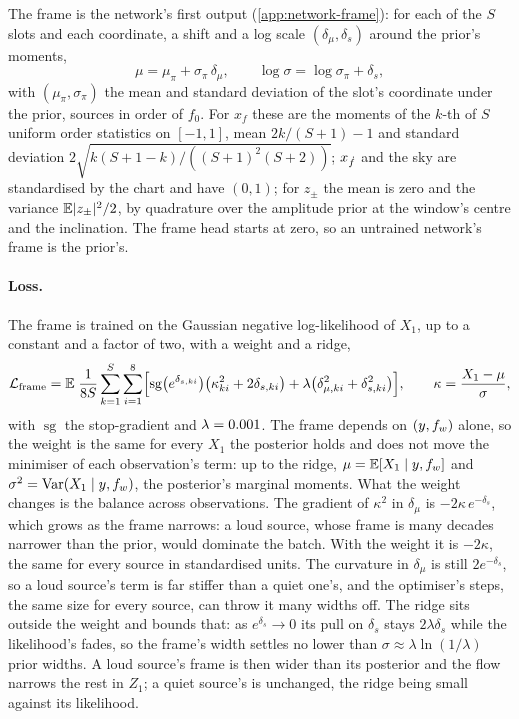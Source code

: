 The frame is the network's first output (\cref{app:network-frame}): for each of the $S$ slots and
each coordinate, a shift and a log scale $(\delta_\mu,\delta_s)$ around the prior's moments,
\begin{equation}
  \mu = \mu_\pi + \sigma_\pi\,\delta_\mu,\qquad \log\sigma = \log\sigma_\pi + \delta_s,
  \label{eq:fm-frame}
\end{equation}
with $(\mu_\pi,\sigma_\pi)$ the mean and standard deviation of the slot's coordinate under the prior,
sources in order of $f_0$. For $x_f$ these are the moments of the $k$-th of $S$ uniform order
statistics on $[-1,1]$, mean $2k/(S+1)-1$ and standard deviation
$2\sqrt{k(S+1-k)/((S+1)^2(S+2))}$; $x_{\dot f}$ and the sky are standardised by the chart and have
$(0,1)$; for $z_\pm$ the mean is zero and the variance $\mathbb{E}\lvert z_\pm\rvert^2/2$, by quadrature over
the amplitude prior at the window's centre and the inclination. The frame head starts at zero, so an
untrained network's frame is the prior's.

\paragraph{Loss.}
The frame is trained on the Gaussian negative log-likelihood of $X_1$, up to a constant and a
factor of two, with a weight and a ridge,
\begin{equation}
  \mathcal L_{\rm frame} = \mathbb{E}\;\frac{1}{8S}\sum_{k=1}^{S}\sum_{i=1}^{8}
  \Bigl[\operatorname{sg}\bigl(e^{\delta_{s,ki}}\bigr)\bigl(\kappa_{ki}^2 + 2\delta_{s,ki}\bigr)
  + \lambda\bigl(\delta_{\mu,ki}^2 + \delta_{s,ki}^2\bigr)\Bigr],\qquad
  \kappa = \frac{X_1-\mu}{\sigma},
  \label{eq:fm-frame-loss}
\end{equation}
with $\operatorname{sg}$ the stop-gradient and $\lambda = 0.001{}$. The frame
depends on $(y,f_{w})$ alone, so the weight is the same for every $X_1$ the posterior holds and does
not move the minimiser of each observation's term: up to the ridge, $\mu = \mathbb{E}[X_1\mid y,f_{w}]$ and
$\sigma^2 = \operatorname{Var}(X_1\mid y,f_{w})$, the posterior's marginal moments. What the weight changes is the
balance across observations. The gradient of $\kappa^2$ in $\delta_\mu$ is $-2\kappa\,e^{-\delta_s}$,
which grows as the frame narrows: a loud source, whose frame is many decades narrower than the
prior, would dominate the batch. With the weight it is $-2\kappa$, the same for every source in
standardised units. The curvature in $\delta_\mu$ is still $2e^{-\delta_s}$, so a loud source's
term is far stiffer than a quiet one's, and the optimiser's steps, the same size for every source,
can throw it many widths off. The ridge sits outside the weight and bounds that: as
$e^{\delta_s}\to 0$ its pull on $\delta_s$ stays $2\lambda\delta_s$ while the likelihood's fades, so
the frame's width settles no lower than $\sigma \approx \lambda\ln(1/\lambda)$ prior widths. A loud
source's frame is then wider than its posterior and the flow narrows the rest in $Z_1$; a quiet
source's is unchanged, the ridge being small against its likelihood.

